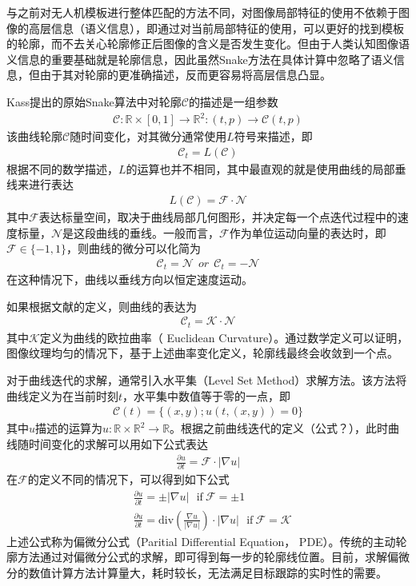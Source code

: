 与之前对无人机模板进行整体匹配的方法不同，对图像局部特征的使用不依赖于图像的高层信息（语义信息），即通过对当前局部特征的使用，可以更好的找到模板的轮廓，而不去关心轮廓修正后图像的含义是否发生变化。但由于人类认知图像语义信息的重要基础就是轮廓信息，因此虽然Snake方法在具体计算中忽略了语义信息，但由于其对轮廓的更准确描述，反而更容易将高层信息凸显。

Kass提出的原始Snake算法中对轮廓$\mathcal{C}$的描述是一组参数
\begin{align}
\mathcal{C}:\mathbb{R} \times [0,1] \rightarrow \mathbb{R}^2:(t,p) \rightarrow \mathcal{C}(t,p)
\end{align}
该曲线轮廓$\mathcal{C}$随时间变化，对其微分通常使用$L$符号来描述，即
\begin{align}
\mathcal{C}_t =L(\mathcal{C})
\end{align}
根据不同的数学描述，$L$的运算也并不相同，其中最直观的就是使用曲线的局部垂线来进行表达
\begin{align}
L(\mathcal{C}) = \mathcal{F} \cdot \mathcal{N}
\end{align}
其中$\mathcal{F}$表达标量空间，取决于曲线局部几何图形，并决定每一个点迭代过程中的速度标量，$\mathcal{N}$是这段曲线的垂线。一般而言，$\mathcal{F}$作为单位运动向量的表达时，即$\mathcal{F} \in \{-1, 1\}$，则曲线的微分可以化简为
\begin{align}
\mathcal{C}_t = \mathcal{N}\ \ or\  \ \mathcal{C}_t= -\mathcal{N}
\end{align}
在这种情况下，曲线以垂线方向以恒定速度运动。

如果根据文献\cite{guichard2004contrast}的定义，则曲线的表达为
\begin{align}
\mathcal{C}_t = \mathcal{K}\cdot\mathcal{N}
\end{align}
其中$\mathcal{K}$定义为曲线的欧拉曲率（ Euclidean Curvature）。通过数学定义可以证明\cite{kimmel2012numerical}，图像纹理均匀的情况下，基于上述曲率变化定义，轮廓线最终会收敛到一个点。

对于曲线迭代的求解，通常引入水平集（Level Set Method）求解方法。该方法将曲线定义为在当前时刻$t$，水平集中数值等于零的一点，即
\begin{align}
\mathcal{C}(t)=\{(x,y);u(t,(x,y))=0\}
\end{align}
其中$u$描述的运算为$u:\mathbb{R} \times \mathbb{R}^2 \rightarrow \mathbb{R} $。根据之前曲线迭代的定义（公式？），此时曲线随时间变化的求解可以用如下公式表达\cite{kimmel2012numerical}
\begin{align}
\frac{\partial u}{\partial t}=\mathcal{F}\cdot|\nabla u|
\end{align}
在$\mathcal{F}$的定义不同的情况下，可以得到如下公式
\begin{align}
&\frac{\partial u}{\partial t}= \pm|\nabla u|\ \ \ \text{if}\ \mathcal{F} = \pm1 \\
&\frac{\partial u}{\partial t}= \text{div}(\frac{\nabla u}{|\nabla u|})\cdot |\nabla u|\ \ \ \text{if}\ \mathcal{F} = \mathcal{K}
\end{align}
上述公式称为偏微分公式（Paritial Differential Equation， PDE）。传统的主动轮廓方法通过对偏微分公式的求解，即可得到每一步的轮廓线位置。目前，求解偏微分的数值计算方法计算量大，耗时较长，无法满足目标跟踪的实时性的需要。

